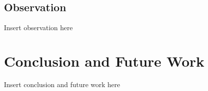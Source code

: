 \documentclass[conference]{IEEEtran}
\begin{document}
\subsection{Observation}

Insert observation here



\section{Conclusion and Future Work}

Insert conclusion and future work here

\end{document}
